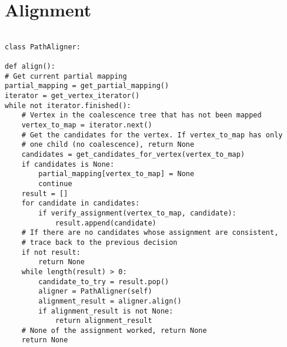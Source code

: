 \documentclass[14pt]{extarticle}
\begin{document}
\newpage

\section{Alignment}

\vspace*{-\baselineskip}

\begin{lstlisting}

class PathAligner:

def align():
# Get current partial mapping
partial_mapping = get_partial_mapping()
iterator = get_vertex_iterator()
while not iterator.finished():
	# Vertex in the coalescence tree that has not been mapped
	vertex_to_map = iterator.next()
	# Get the candidates for the vertex. If vertex_to_map has only
	# one child (no coalescence), return None
	candidates = get_candidates_for_vertex(vertex_to_map)
	if candidates is None:
		partial_mapping[vertex_to_map] = None
		continue
	result = []
	for candidate in candidates:
		if verify_assignment(vertex_to_map, candidate):
			result.append(candidate)
	# If there are no candidates whose assignment are consistent,
	# trace back to the previous decision
	if not result:
		return None			
	while length(result) > 0:
		candidate_to_try = result.pop()
		aligner = PathAligner(self)
		alignment_result = aligner.align()
		if alignment_result is not None:
			return alignment_result
	# None of the assignment worked, return None
	return None
\end{lstlisting}
\end{document}
